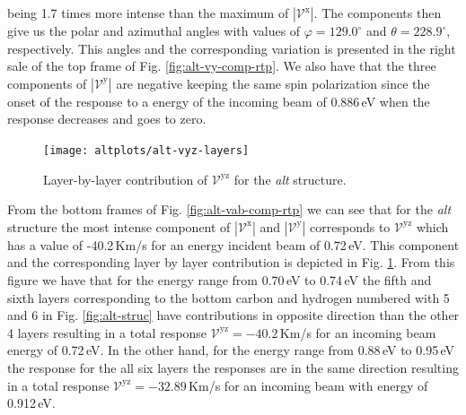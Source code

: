 \documentclass[prb,11pt,tightenlines,twocolumn,aps]{revtex4-1}
\begin{document}
being 1.7 times more intense than the maximum of $|\mathcal{V}^{\mathrm{x}}|$.
The components then give us the polar and azimuthal angles with values of
$\varphi=129.0^{\circ}$ and $\theta=228.9^{\circ}$, respectively. This angles
and the corresponding variation is presented in the right sale of the top frame
of Fig. \ref{fig:alt-vy-comp-rtp}.
% 
We also have that the three components of $|\mathcal{V}^{\mathrm{y}}|$ are
negative keeping the same spin polarization since the onset of the response to a
energy of the incoming beam of 0.886\,eV when the response decreases and goes to
zero.
\begin{figure}[tb]
    \centering
    \texttt{[image: altplots/alt-vyz-layers]}
    \caption{Layer-by-layer contribution of $\mathcal{V}^{\mathrm{yz}}$ for the
     \emph{alt} structure.}
    \label{fig:alt-vyz-lay}
\end{figure}
From the bottom frames of Fig. \ref{fig:alt-vab-comp-rtp} we can see that for
the \emph{alt} structure the most intense component of
$|\mathcal{V}^{\mathrm{x}}|$ and $|\mathcal{V}^{\mathrm{y}}|$ corresponds to
$\mathcal{V}^{\mathrm{yz}}$ which has a value of -40.2\,Km/s for an
energy incident beam of 0.72\,eV. This component and the corresponding layer by
layer contribution is depicted in Fig. \ref{fig:alt-vyz-lay}. From this figure
we have that for the energy range from 0.70\,eV to 0.74\,eV the fifth and sixth
layers corresponding to the bottom carbon and hydrogen numbered with 5 and 6 in
Fig. \ref{fig:alt-struc} have contributions in opposite direction than the other
4 layers resulting in a total response $\mathcal{V}^{\mathrm{yz}}= -40.2$\,Km/s
for an incoming beam energy of 0.72\,eV. In the other hand, for the energy range
from 0.88\,eV to 0.95\,eV the response for the all six layers the responses are
in the same direction resulting in a total response
$\mathcal{V}^{\mathrm{yz}}=-32.89$\,Km/s for an incoming beam with energy of
0.912\,eV.

\end{document}
